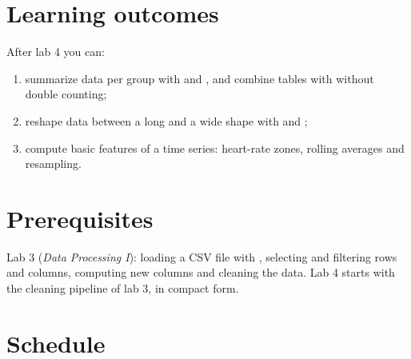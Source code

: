 \documentclass[11pt,a4paper]{article}
\begin{document}



\section{Learning outcomes}

After lab 4 you can:

\begin{enumerate}[label=\textbf{LO\arabic*}, leftmargin=1.4cm]
  \item summarize data per group with  and , and
        combine tables with  without double counting;
  \item reshape data between a long and a wide shape with 
        and ;
  \item compute basic features of a time series: heart-rate zones,
        rolling averages and resampling.
\end{enumerate}

\section{Prerequisites}

Lab 3 (\emph{Data Processing I}): loading a CSV file with ,
selecting and filtering rows and columns, computing new columns and
cleaning the data. Lab 4 starts with the cleaning pipeline of lab 3, in
compact form.





\section{Schedule}



\end{document}
